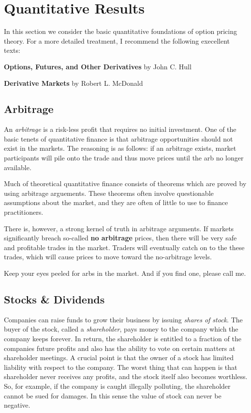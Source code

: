 \documentclass[11pt,]{krantz}
\begin{document}
\chapter{Quantitative Results}\label{quantitative-results}

In this section we consider the basic quantitative foundations of option pricing theory. For a more detailed treatment, I recommend the following execellent texts:

\textbf{Options, Futures, and Other Derivatives} by John C. Hull

\textbf{Derivative Markets} by Robert L. McDonald

\section{Arbitrage}\label{arbitrage}

An \emph{arbitrage} is a risk-less profit that requires no initial investment. One of the basic tenets of quantitative finance is that arbitrage opportunities should not exist in the markets. The reasoning is as follows: if an arbitrage exists, market participants will pile onto the trade and thus move prices until the arb no longer available.

Much of theoretical quantitative finance consists of theorems which are proved by using arbitrage arguements. These theorems often involve questionable assumptions about the market, and they are often of little to use to finance practitioners.

There is, however, a strong kernel of truth in arbitrage arguments. If markets significantly breach so-called \textbf{no arbitrage} prices, then there will be very safe and profitable trades in the market. Traders will eventually catch on to the these trades, which will cause prices to move toward the no-arbitrage levels.

Keep your eyes peeled for arbs in the market. And if you find one, please call me.

\section{Stocks \& Dividends}\label{stocks-dividends}

Companies can raise funds to grow their business by issuing \emph{shares of stock}. The buyer of the stock, called a \emph{shareholder}, pays money to the company which the company keeps forever. In return, the shareholder is entitled to a fraction of the companies future profits and also has the ability to vote on certain matters at shareholder meetings. A crucial point is that the owner of a stock has limited liability with respect to the company. The worst thing that can happen is that shareholder never receives any profits, and the stock itself also becomes worthless. So, for example, if the company is caught illegally polluting, the shareholder cannot be sued for damages. In this sense the value of stock can never be negative.
\end{document}
